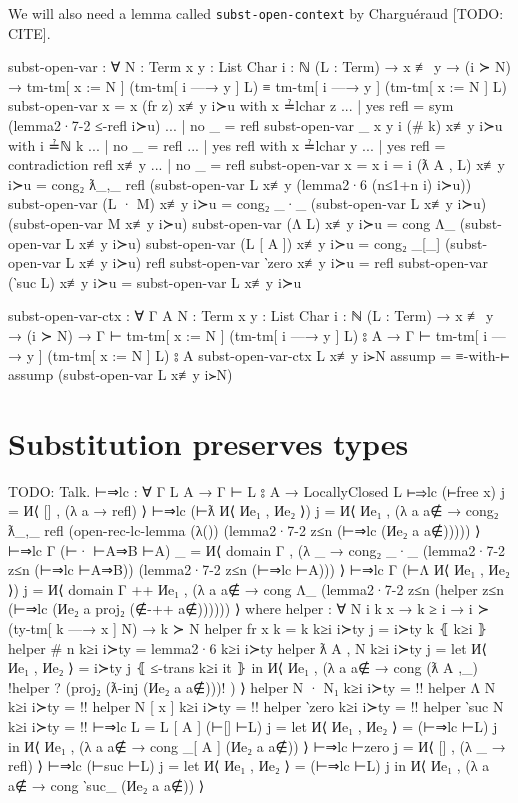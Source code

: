 \documentclass[logo,bsc,singlespacing,parskip,online]{infthesis}
\renewenvironment{code}{\mintedcopy[breaklines,breaksymbolleft=\;]{agda}}{\endmintedcopy}
\begin{document}
We will also need a lemma called \texttt{subst-open-context}
by Charguéraud [TODO: CITE].

\begin{code}
  subst-open-var : ∀ {N : Term} {x y : List Char} {i : ℕ}
    (L : Term)
    → x ≢ y
    → (i ≻ N)
    → tm-tm[ x := N ] (tm-tm[ i —→ y ] L)
      ≡ tm-tm[ i —→ y ] (tm-tm[ x := N ] L)
  subst-open-var {x = x} (fr z) x≢y i≻u with x ≟lchar z
  ... | yes refl = sym (lemma2·7-2 ≤-refl i≻u)
  ... | no  _    = refl
  subst-open-var {_} {x} {y} {i} (# k) x≢y i≻u with i ≟ℕ k
  ... | no  _ = refl
  ... | yes refl with x ≟lchar y
  ...    | yes refl = contradiction refl x≢y
  ...    | no  _    = refl
  subst-open-var {x = x} {i = i} (ƛ A , L) x≢y i≻u
    = cong₂ ƛ_,_
      refl
      (subst-open-var L x≢y (lemma2·6 (n≤1+n i) i≻u))
  subst-open-var (L · M) x≢y i≻u = cong₂ _·_
    (subst-open-var L x≢y i≻u) (subst-open-var M x≢y i≻u)
  subst-open-var (Λ L) x≢y i≻u =
    cong Λ_ (subst-open-var L x≢y i≻u)
  subst-open-var (L [ A ]) x≢y i≻u =
    cong₂ _[_] (subst-open-var L x≢y i≻u) refl
  subst-open-var ‵zero x≢y i≻u = refl
  subst-open-var (‵suc L) x≢y i≻u = subst-open-var L x≢y i≻u

  subst-open-var-ctx : ∀ {Γ A} {N : Term} {x y : List Char} {i : ℕ}
    (L : Term)
    → x ≢ y
    → (i ≻ N)
    → Γ ⊢ tm-tm[ x := N ] (tm-tm[ i —→ y ] L) ⦂ A
    → Γ ⊢ tm-tm[ i —→ y ] (tm-tm[ x := N ] L) ⦂ A
  subst-open-var-ctx L x≢y i≻N assump =
    ≡-with-⊢ assump (subst-open-var L x≢y i≻N)
\end{code}

\section{Substitution preserves types}
TODO: Talk.
\begin{code}
  ⊢⇒lc : ∀ {Γ L A} → Γ ⊢ L ⦂ A → LocallyClosed L
  ⊢⇒lc (⊢free x) j = И⟨ [] , (λ a → refl) ⟩
  ⊢⇒lc (⊢ƛ И⟨ Иe₁ , Иe₂ ⟩) j = И⟨ Иe₁ , (λ a {a∉} → cong₂ ƛ_,_ refl
    (open-rec-lc-lemma
      (λ())
      (lemma2·7-2 z≤n (⊢⇒lc (Иe₂ a {a∉}))))) ⟩
  ⊢⇒lc {Γ} (⊢· ⊢A⇒B ⊢A) _ = И⟨ domain Γ , (λ _ → cong₂ _·_
    (lemma2·7-2 z≤n (⊢⇒lc ⊢A⇒B)) (lemma2·7-2 z≤n (⊢⇒lc ⊢A))) ⟩
  ⊢⇒lc {Γ} (⊢Λ И⟨ Иe₁ , Иe₂ ⟩) j = И⟨ domain Γ ++ Иe₁ , (λ a {a∉} → cong Λ_ (lemma2·7-2 z≤n (helper z≤n (⊢⇒lc (Иe₂ a {proj₂ (∉-++ a∉)}))))) ⟩
    where
      helper : ∀ {N i k x}
        → k ≥ i
        → i ≻ (ty-tm[ k —→ x ] N)
        → k ≻ N
      helper {fr x} {k = k} k≥i i≻ty j = i≻ty k ⦃ k≥i ⦄
      helper {# n} k≥i i≻ty = lemma2·6 k≥i i≻ty
      helper {ƛ A , N} k≥i i≻ty j =
        let И⟨ Иe₁ , Иe₂ ⟩ = i≻ty j ⦃ ≤-trans k≥i it ⦄
        in И⟨ Иe₁ , (λ a {a∉} → cong (ƛ A ,_) {!helper ? (proj₂ (ƛ-inj (Иe₂ a {a∉})))!} ) ⟩
      helper {N · N₁} k≥i i≻ty = {!!}
      helper {Λ N} k≥i i≻ty = {!!}
      helper {N [ x ]} k≥i i≻ty = {!!}
      helper {‵zero} k≥i i≻ty = {!!}
      helper {‵suc N} k≥i i≻ty = {!!}
  ⊢⇒lc {L = L [ A ]} (⊢[] ⊢L) j =
    let И⟨ Иe₁ , Иe₂ ⟩ = (⊢⇒lc ⊢L) j
    in И⟨ Иe₁ , (λ a {a∉} → cong _[ A ]  (Иe₂ a {a∉})) ⟩
  ⊢⇒lc ⊢zero j = И⟨ [] , (λ _ → refl) ⟩
  ⊢⇒lc (⊢suc ⊢L) j =
    let И⟨ Иe₁ , Иe₂ ⟩ = (⊢⇒lc ⊢L) j
    in И⟨ Иe₁ , (λ a {a∉} → cong ‵suc_ (Иe₂ a {a∉})) ⟩
\end{code}
\end{document}
